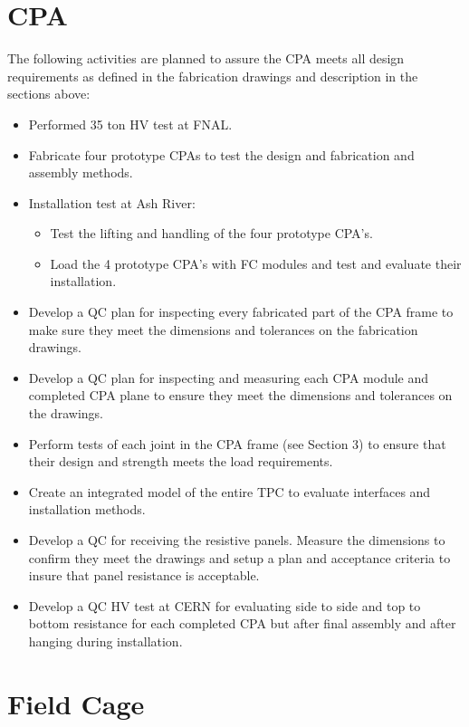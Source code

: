 \section{CPA}

The following activities are planned to assure the CPA meets all design requirements as defined in the fabrication drawings and description in the sections above:
\begin{itemize}
\item Performed 35 ton HV test at FNAL.
\item Fabricate four prototype CPAs to test the design and fabrication and assembly methods.
\item Installation test at Ash River:
\begin{itemize}
\item Test the lifting and handling of the four prototype CPA's.
\item  Load the 4 prototype CPA's with FC modules and test and evaluate their installation.
\end{itemize}
\item Develop a QC plan for inspecting every fabricated part of the CPA frame to make sure they meet the dimensions and tolerances on the fabrication drawings.
\item Develop a QC plan for inspecting and measuring each CPA module and completed CPA plane to ensure they meet the dimensions and tolerances on the drawings.
\item Perform tests of each joint in the CPA frame (see Section 3) to ensure that their design and strength meets the load requirements.
\item Create an integrated model of the entire TPC to evaluate interfaces and installation methods.  
\item Develop a QC for receiving the resistive panels.  Measure the dimensions to confirm they meet the drawings and setup a plan and acceptance criteria to insure that panel resistance is acceptable.
\item Develop a QC  HV test at CERN for evaluating side to side and top to bottom resistance for each completed CPA but after final assembly and after hanging during installation.  
\end{itemize}

\section{Field Cage}


